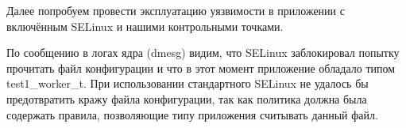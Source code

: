 

Далее попробуем провести эксплуатацию уязвимости в приложении с
включённым SELinux и нашими контрольными точками.



По сообщению в логах ядра (dmesg) видим, что SELinux заблокировал
попытку прочитать файл конфигурации и что в этот момент приложение
обладало типом test1\_worker\_t. При использовании стандартного SELinux
не удалось бы предотвратить кражу файла конфигурации, так как политика
должна была содержать правила, позволяющие типу приложения считывать
данный файл.


